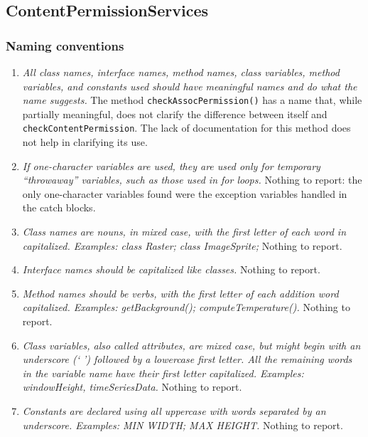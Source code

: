 \subsection{ContentPermissionServices}

	\subsubsection{Naming conventions}
		\begin{enumerate}
			\setcounter{enumi}{0}
			\item \textit{All class names, interface names, method names, class variables, method variables, and constants used should have meaningful names and do what the name suggests.}
			The method \texttt{checkAssocPermission()} has a name that, while partially meaningful, does not clarify the difference between itself and \texttt{checkContentPermission}. The lack of documentation for this method does not help in clarifying its use. 

			\item \textit{If one-character variables are used, they are used only for temporary “throwaway” variables, such as those used in for loops.}\newline
			Nothing to report: the only one-character variables found were the exception variables handled in the catch blocks. %

			\item \textit{Class names are nouns, in mixed case, with the first letter of each word in capitalized. Examples: class Raster; class ImageSprite;}\newline
			Nothing to report.
			
			\item \textit{Interface names should be capitalized like classes.}\newline
			Nothing to report.
			
			\item \textit{Method names should be verbs, with the first letter of each addition word capitalized. Examples: getBackground(); computeTemperature().}\newline
			Nothing to report. %

			\item \textit{Class variables, also called attributes, are mixed case, but might begin with an underscore (‘ ’) followed by a lowercase first letter. All the remaining words in the variable name have their first letter capitalized. Examples: windowHeight, timeSeriesData.}\newline
			Nothing to report. %

			\item \textit{Constants are declared using all uppercase with words separated by an underscore. Examples: MIN WIDTH; MAX HEIGHT.}\newline
			Nothing to report. %

		\end{enumerate}

